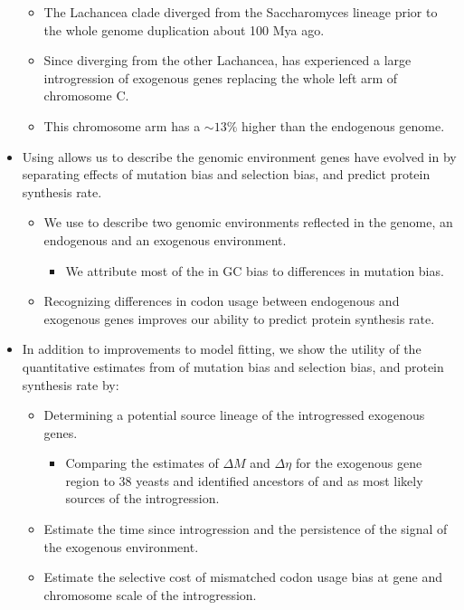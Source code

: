 \documentclass[12pt]{article}
\begin{document}
\begin{itemize}
	\begin{itemize}
		\item The Lachancea clade diverged from the Saccharomyces lineage prior to the whole genome duplication about 100 Mya ago.
		\item Since diverging from the other Lachancea, \kluyveri has experienced a large introgression of exogenous genes replacing the whole left arm of chromosome C. 
		\item This chromosome arm has a \GC  $\sim 13 \%$ higher than the endogenous \kluyveri genome.
	\end{itemize}
	\item Using \ROC allows us to describe the genomic environment genes have evolved in by separating effects of mutation bias and selection bias, and predict protein synthesis rate.
	\begin{itemize}
		\item We use \ROC to describe two genomic environments reflected in the \kluyveri genome, an endogenous and an exogenous environment.
		\begin{itemize}
			\item We attribute most of the in GC bias to differences in mutation bias.
		\end{itemize}
		\item Recognizing differences in codon usage between endogenous and exogenous genes improves our ability to predict protein synthesis rate. 
	\end{itemize}
	\item In addition to improvements to model fitting, we show the utility of the quantitative estimates from \ROC of mutation bias and selection bias, and protein synthesis rate by:
	\begin{itemize}
		\item Determining a potential source lineage of the introgressed exogenous genes.
		\begin{itemize}
			\item Comparing the estimates of $\Delta M$ and $\Delta \eta$ for the exogenous gene region to 38 yeasts and identified ancestors of \gossypii and \dubl as most likely sources of the introgression.
		\end{itemize}
		\item Estimate the time since introgression and the persistence of the signal of the exogenous environment.
		\item Estimate the selective cost of mismatched codon usage bias at gene and chromosome scale of the introgression.
	\end{itemize}
\end{itemize}
\end{document}
